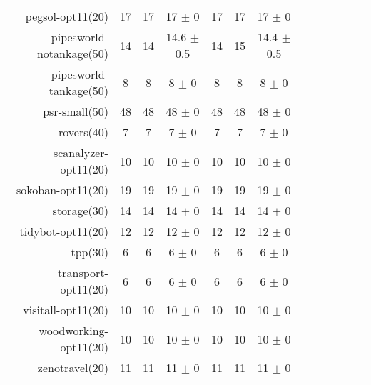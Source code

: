 \begin{center}
\begin{tabular}{|r|*{4}{ccc|}}
pegsol-opt11(20) & 17 & 17 & 17 \(\pm\) 0 & 17 & 17 & 17 \(\pm\) 0\\
pipesworld-notankage(50) & 14 & 14 & 14.6 \(\pm\) 0.5 & 14 & 15 & 14.4 \(\pm\) 0.5\\
pipesworld-tankage(50) & 8 & 8 & 8 \(\pm\) 0 & 8 & 8 & 8 \(\pm\) 0\\
psr-small(50) & 48 & 48 & 48 \(\pm\) 0 & 48 & 48 & 48 \(\pm\) 0\\
rovers(40) & 7 & 7 & 7 \(\pm\) 0 & 7 & 7 & 7 \(\pm\) 0\\
scanalyzer-opt11(20) & 10 & 10 & 10 \(\pm\) 0 & 10 & 10 & 10 \(\pm\) 0\\
sokoban-opt11(20) & 19 & 19 & 19 \(\pm\) 0 & 19 & 19 & 19 \(\pm\) 0\\
storage(30) & 14 & 14 & 14 \(\pm\) 0 & 14 & 14 & 14 \(\pm\) 0\\
tidybot-opt11(20) & 12 & 12 & 12 \(\pm\) 0 & 12 & 12 & 12 \(\pm\) 0\\
tpp(30) & 6 & 6 & 6 \(\pm\) 0 & 6 & 6 & 6 \(\pm\) 0\\
transport-opt11(20) & 6 & 6 & 6 \(\pm\) 0 & 6 & 6 & 6 \(\pm\) 0\\
visitall-opt11(20) & 10 & 10 & 10 \(\pm\) 0 & 10 & 10 & 10 \(\pm\) 0\\
woodworking-opt11(20) & 10 & 10 & 10 \(\pm\) 0 & 10 & 10 & 10 \(\pm\) 0\\
zenotravel(20) & 11 & 11 & 11 \(\pm\) 0 & 11 & 11 & 11 \(\pm\) 0\\
\end{tabular}
\end{center}
